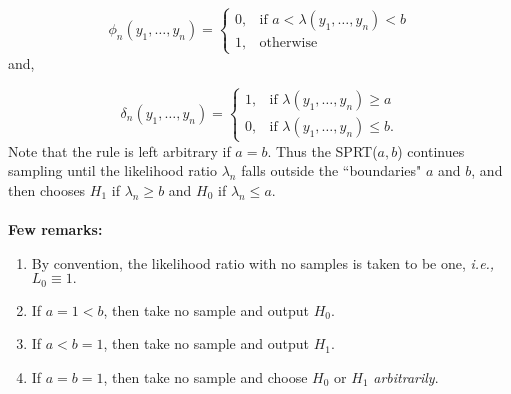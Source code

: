 \documentclass[a4paper,english,12pt]{article}
\begin{document}
\[
\phi_n(y_1,\ldots,y_n) =  
\begin{cases}
  0, & \text{if } a < \lambda(y_1,\ldots,y_n) < b\\
  1, & \text{otherwise}

\end{cases}
\]
and,

\[
\delta_n(y_1,\ldots,y_n) =  
\begin{cases}
  1, & \text{if } \lambda(y_1,\ldots,y_n) \geq a\\
  0, & \text{if } \lambda(y_1,\ldots,y_n) \leq b.

\end{cases}
\] 
Note that the rule is left arbitrary if $a=b$. Thus the SPRT($a,b$) continues sampling until the likelihood ratio $\lambda_n$ falls outside the ``boundaries" $a$ and $b$, and then chooses $H_1$ if $\lambda_n \geq b$ and $H_0$ if $\lambda_n \leq a$. \\\\
\textbf{Few remarks:}
\begin{enumerate}
\item By convention, the likelihood ratio with no samples is taken to be one, \textit{i.e.,} $L_0 \equiv 1.$
\item If $a=1<b$, then take no sample and output $H_0$.
\item If $a<b=1$, then take no sample and output $H_1$.
\item If $a=b=1$, then take no sample and choose $H_0$ or $H_1$ \textit{arbitrarily}.
\end{enumerate}
\end{document}
